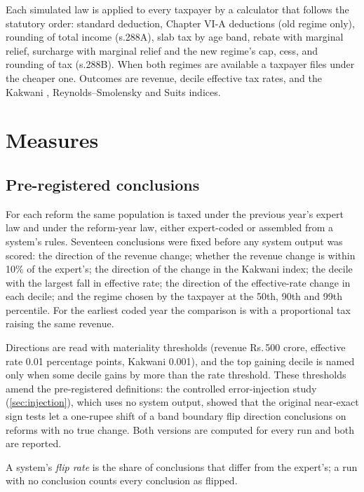 \documentclass[sn-apa]{sn-jnl}
\providecommand{\rupee}{Rs.\,}
\begin{document}
Each simulated law is applied to every taxpayer by a calculator that follows
the statutory order: standard deduction, Chapter VI-A deductions (old regime
only), rounding of total income (s.288A), slab tax by age band, rebate with
marginal relief, surcharge with marginal relief and the new regime's cap,
cess, and rounding of tax (s.288B). When both regimes are available a
taxpayer files under the cheaper one. Outcomes are revenue, decile effective
tax rates, and the Kakwani \citep{kakwani1977measurement},
Reynolds--Smolensky \citep{reynolds1977postfisc} and Suits \citep{suits1977measurement} indices.

\section{Measures}\label{sec:measures}

\subsection{Pre-registered conclusions}
For each reform the same population is taxed under the previous year's
expert law and under the reform-year law, either expert-coded or assembled
from a system's rules. Seventeen conclusions were fixed before any system
output was scored: the direction of the revenue change; whether the revenue
change is within 10\% of the expert's; the direction of the change in the
Kakwani index; the decile with the largest fall in effective rate; the
direction of the effective-rate change in each decile; and the regime chosen
by the taxpayer at the 50th, 90th and 99th percentile. For the earliest coded
year the comparison is with a proportional tax raising the same revenue.

Directions are read with materiality thresholds (revenue \rupee500 crore,
effective rate 0.01 percentage points, Kakwani 0.001), and the top gaining
decile is named only when some decile gains by more than the rate threshold.
These thresholds amend the pre-registered definitions: the controlled
error-injection study (\cref{sec:injection}), which uses no system output,
showed that the original near-exact sign tests let a one-rupee shift of a
band boundary flip direction conclusions on reforms with no true change.
Both versions are computed for every run and both are reported.

A system's \emph{flip rate} is the share of conclusions that differ from the
expert's; a run with no conclusion counts every conclusion as flipped.
\end{document}
